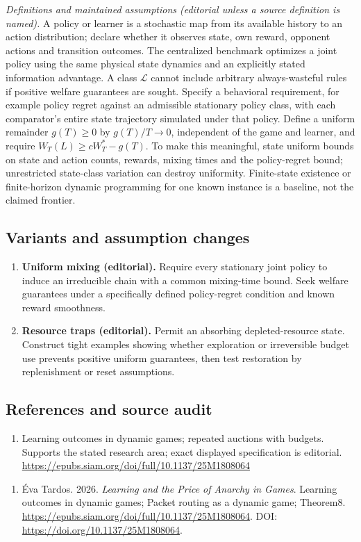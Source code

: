 \documentclass[11pt,a4paper]{article}
\begin{document}
\emph{Definitions and maintained assumptions (editorial unless a source definition is named).} A policy or learner is a stochastic map from its available history to an action distribution; declare whether it observes state, own reward, opponent actions and transition outcomes. The centralized benchmark optimizes a joint policy using the same physical state dynamics and an explicitly stated information advantage. A class \(\mathcal L\) cannot include arbitrary always-wasteful rules if positive welfare guarantees are sought. Specify a behavioral requirement, for example policy regret against an admissible stationary policy class, with each comparator’s entire state trajectory simulated under that policy. Define a uniform remainder \(g(T)\ge0\) by \(g(T)/T\to0\), independent of the game and learner, and require \(W_T(L)\ge cW_T^*-g(T)\). To make this meaningful, state uniform bounds on state and action counts, rewards, mixing times and the policy-regret bound; unrestricted state-class variation can destroy uniformity. Finite-state existence or finite-horizon dynamic programming for one known instance is a baseline, not the claimed frontier.
\subsection*{Variants and assumption changes}
\begin{enumerate}
\item \textbf{Uniform mixing (editorial).} Require every stationary joint policy to induce an irreducible chain with a common mixing-time bound. Seek welfare guarantees under a specifically defined policy-regret condition and known reward smoothness.
\item \textbf{Resource traps (editorial).} Permit an absorbing depleted-resource state. Construct tight examples showing whether exploration or irreversible budget use prevents positive uniform guarantees, then test restoration by replenishment or reset assumptions.
\end{enumerate}
\subsection*{References and source audit}
\begin{enumerate}
\item Learning outcomes in dynamic games; repeated auctions with budgets. Supports the stated research area; exact displayed specification is editorial. \url{https://epubs.siam.org/doi/full/10.1137/25M1808064}
\end{enumerate}
\begin{enumerate}\raggedright
\item\hypertarget{definitions:source:30007567:1}{} Éva Tardos. 2026. \emph{Learning and the Price of Anarchy in Games}. Learning outcomes in dynamic games; Packet routing as a dynamic game; Theorem8.
\url{https://epubs.siam.org/doi/full/10.1137/25M1808064}.
DOI: \url{https://doi.org/10.1137/25M1808064}.
\end{enumerate}
\end{document}
